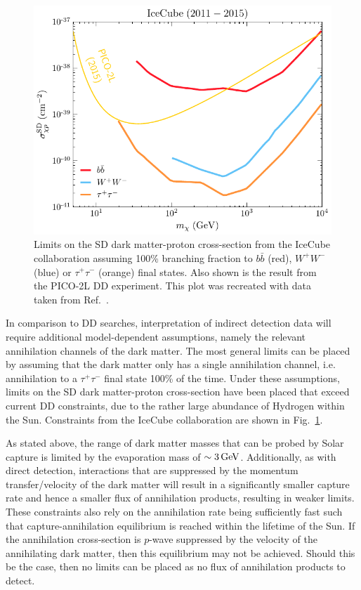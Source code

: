 \begin{figure}[!t]
    \centering
    \includegraphics{IceCube_2016.pdf}
    \caption[Limits on the SD dark matter-proton cross-section from the IceCube collaboration assuming 100\% branching fraction to $b\bar{b}$ (red), $W^+ W^-$ (blue) or $\tau^+ \tau^-$ (orange) final states]{Limits on the SD dark matter-proton cross-section from the IceCube collaboration assuming 100\% branching fraction to $b\bar{b}$ (red), $W^+ W^-$ (blue) or $\tau^+ \tau^-$ (orange) final states. Also shown is the result from the PICO-2L DD experiment. This plot was recreated with data taken from Ref.~\cite{IceCube:2016dgk_mar_Searchannihilatingdark}.}
    \label{ch1:fig:IceCube_2016_SD}
\end{figure}

In comparison to DD searches, interpretation of indirect detection data will require additional model-dependent assumptions, namely the relevant annihilation channels of the dark matter. 
The most general limits can be placed by assuming that the dark matter only has a single annihilation channel, i.e. annihilation to a $\tau^+\tau^-$ final state 100\% of the time. 
Under these assumptions, limits on the SD dark matter-proton cross-section have been placed that exceed current DD constraints, due to the rather large abundance of Hydrogen within the Sun. Constraints from the IceCube collaboration are shown in Fig.~\ref{ch1:fig:IceCube_2016_SD}.

As stated above, the range of dark matter masses that can be probed by Solar capture is limited by the evaporation mass of $\sim 3{\rm \,GeV}$. Additionally, as with direct detection, interactions that are suppressed by the momentum transfer/velocity of the dark matter will result in a significantly smaller capture rate and hence a smaller flux of annihilation products, resulting in weaker limits. These constraints also rely on the annihilation rate being sufficiently fast such that capture-annihilation equilibrium is reached within the lifetime of the Sun. If the annihilation cross-section is $p$-wave suppressed by the velocity of the annihilating dark matter, then this equilibrium may not be achieved. Should this be the case, then no limits can be placed as no flux of annihilation products to detect. 

